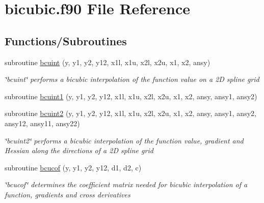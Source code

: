 \hypertarget{bicubic_8f90}{\section{bicubic.\-f90 File Reference}
\label{bicubic_8f90}
}
\subsection*{Functions/\-Subroutines}
\begin{DoxyCompactItemize}
\item 
subroutine \hyperlink{bicubic_8f90_aca7f463d4376acdf92e26b46628f1023}{bcuint} (y, y1, y2, y12, x1l, x1u, x2l, x2u, x1, x2, ansy)
\begin{DoxyCompactList}\small\item\em \char`\"{}bcuint\char`\"{} performs a bicubic interpolation of the function value on a 2\-D spline grid \end{DoxyCompactList}\item 
subroutine \hyperlink{bicubic_8f90_a8ed3e992a2eb55b129ff40b7b86f2130}{bcuint1} (y, y1, y2, y12, x1l, x1u, x2l, x2u, x1, x2, ansy, ansy1, ansy2)
\item 
subroutine \hyperlink{bicubic_8f90_a787ddf3b204bc6fbb15c1595e6c82caf}{bcuint2} (y, y1, y2, y12, x1l, x1u, x2l, x2u, x1, x2, ansy, ansy1, ansy2, ansy12, ansy11, ansy22)
\begin{DoxyCompactList}\small\item\em \char`\"{}bcuint2\char`\"{} performs a bicubic interpolation of the function value, gradient and Hessian along the directions of a 2\-D spline grid \end{DoxyCompactList}\item 
subroutine \hyperlink{bicubic_8f90_a8c9afc23680c8b8f0e5c90476d2cb2f6}{bcucof} (y, y1, y2, y12, d1, d2, c)
\begin{DoxyCompactList}\small\item\em \char`\"{}bcucof\char`\"{} determines the coefficient matrix needed for bicubic interpolation of a function, gradients and cross derivatives \end{DoxyCompactList}\end{DoxyCompactItemize}


